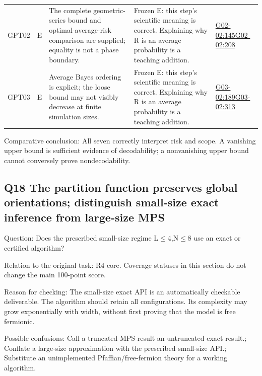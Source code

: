 \documentclass[11pt,a4paper]{article}
\begin{document}
{\begin{longtable}
{}GPT02 & E & The complete geometric-series bound and optimal-average-risk comparison are supplied; equality is not a phase boundary. & Frozen E: this step’s scientific meaning is correct. Explaining why R is an average probability is a teaching addition. & \hyperref[src:G02-02]{G02-02:145}\newline \hyperref[src:G02-02]{G02-02:208}\tabularnewline
{}GPT03 & E & Average Bayes ordering is explicit; the loose bound may not visibly decrease at finite simulation sizes. & Frozen E: this step’s scientific meaning is correct. Explaining why R is an average probability is a teaching addition. & \hyperref[src:G03-02]{G03-02:189}\newline \hyperref[src:G03-02]{G03-02:313}\tabularnewline
\bottomrule
\end{longtable}
}
Comparative conclusion: All seven correctly interpret risk and scope. A vanishing upper bound is sufficient evidence of decodability; a nonvanishing upper bound cannot conversely prove nondecodability.

\clearpage
\subsection{Q18 The partition function preserves global orientations; distinguish small-size exact inference from large-size MPS}
\label{aspect:Q18}
Question: Does the prescribed small-size regime L\ensuremath{\leq}4,\allowbreak{}N\ensuremath{\leq}8 use an exact or certified algorithm?

Relation to the original task: R4 core. Coverage statuses in this section do not change the main 100-point score.

Reason for checking: The small-size exact API is an automatically checkable deliverable. The algorithm should retain all configurations. Its complexity may grow exponentially with width,\allowbreak{} without first proving that the model is free fermionic.

Possible confusions: Call a truncated MPS result an untruncated exact result.; Conflate a large-size approximation with the prescribed small-size API.; Substitute an unimplemented Pfaffian/\allowbreak{}free-fermion theory for a working algorithm.
\end{document}
